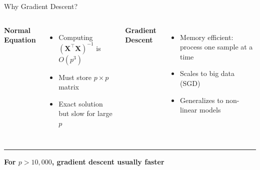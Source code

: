 \documentclass[8pt,aspectratio=169]{beamer}
\newcommand{\bottomnote}[1]{%
\vfill
\vspace{-2mm}
\textcolor{mllavender2}{\rule{\textwidth}{0.4pt}}
\vspace{1mm}
\footnotesize
\textbf{#1}
}
\begin{document}
\begin{frame}[t]{Why Gradient Descent?}
\begin{columns}[T]
\textbf{\textcolor{MLRed}{Normal Equation}}
\begin{itemize}
  \item Computing $(\mathbf{X}^\top\mathbf{X})^{-1}$ is $O(p^3)$
  \item Must store $p \times p$ matrix
  \item Exact solution but slow for large $p$
\end{itemize}

\textbf{\textcolor{MLGreen}{Gradient Descent}}
\begin{itemize}
  \item Memory efficient: process one sample at a time
  \item Scales to big data (SGD)
  \item Generalizes to non-linear models
\end{itemize}
\end{columns}

\bottomnote{For $p > 10{,}000$, gradient descent usually faster}
\end{frame}
\end{document}
